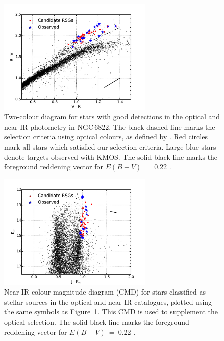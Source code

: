 \begin{figure}
 \centering
 \includegraphics[width=0.65\textwidth]{ngc6822/N6822_bvr}
 \caption[$B-V$ against $V-R$ two colour diagram]{
          Two-colour diagram for stars with good detections in the optical and near-IR photometry in NGC\,6822.
          The black dashed line marks the selection criteria using optical colours, as defined by
          \protect\cite{2012AJ....144....2L}.
          Red circles mark all stars which satisfied our selection criteria.
          Large blue stars denote targets observed with KMOS.
          The solid black line marks the foreground reddening vector for $E(B-V)$~=~0.22
          \protect\citep{1998ApJ...500..525S}.
         }
 \label{fig:BVR}
\end{figure}

\begin{figure}
 \centering
 \includegraphics[width=0.65\textwidth]{ngc6822/N6822_jk}
 \caption[$J-K$ colour magnitude diagram]{
          Near-IR colour-magnitude diagram (CMD) for stars classified as stellar sources in the optical and near-IR catalogues, plotted using the same symbols as Figure~\ref{fig:BVR}.
          This CMD is used to supplement the optical selection.
          The solid black line marks the foreground reddening vector for $E(B-V)$~=~0.22
          \protect\citep{1998ApJ...500..525S}.
         }
 \label{fig:JK}
\end{figure}


